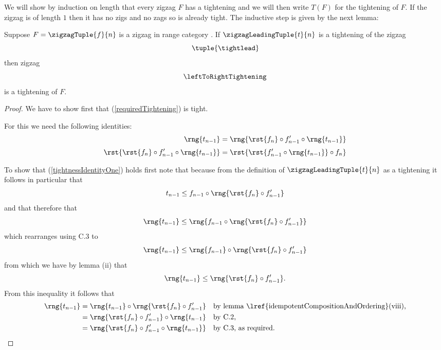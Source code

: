 We will show by induction on length that every zigzag $F$ has a tightening and we will then write $T(F)$ for the tightening of $F$.
If the zigzag is of length $1$ then it has no zigs and no zags so is already tight. The inductive step is given by the next lemma: 

{  %

\begin{lemma}
Suppose  $F=\zigzagTuple{f}{n}$ is a zigzag in range category \catcw.
If  $\zigzagLeadingTuple{t}{n}$ is a tightening of the zigzag
\begin{equation}
\label{inductionPrecursor}
\tuple{\tightlead}
\end{equation}
then  zigzag
\begin{equation}
\label{requiredTightening}\leftToRightTightening
\end{equation}
is a tightening of $F$. 
\end{lemma}
\begin{proof}
We have to show first that (\ref{requiredTightening}) is tight. 

For this we need the following identities:
\begin{align}
\label{tightnessIdentityOne}
\rng{t_{n-1}} &= \rng{\rst{f_n} \circ f'_{n-1} \circ \rng{t_{n-1}}}  \\[0.1cm]
\label{tightnessIdentityTwo}
\rst{\rst{f_n} \circ f'_{n-1} \circ \rng{t_{n-1}}}&=\rst{\rst{f'_{n-1} \circ \rng{t_{n-1}}} \circ f_n}
\end{align}

To show that (\ref{tightnessIdentityOne}) holds first note that 
because from the definition of $\zigzagLeadingTuple{t}{n}$ as a tightening
it follows in particular that
\[
t_{n-1} \leq f_{n-1} \circ \rng{\rst{f_n} \circ f'_{n-1}}
\]
and that therefore that
\[
\rng{t_{n-1}} \leq \rng{f_{n-1} \circ \rng{\rst{f_n} \circ f'_{n-1}}}
\]
which rearranges using C.3 to
\[
\rng{t_{n-1}} \leq \rng{f_{n-1}} \circ \rng{\rst{f_n} \circ f'_{n-1}}
\]
from which we have by lemma (ii)
that 
\[
\rng{t_{n-1}} \leq \rng{\rst{f_n} \circ f'_{n-1}}.
\]
From this inequality it follows that
\begin{align*}
\rng{t_{n-1}} 
           &= \rng{t_{n-1}} \circ \rng{\rst{f_n} \circ f'_{n-1}}
           && \mbox{by lemma \lref{idempotentCompositionAndOrdering}(viii),}\\
           &= \rng{\rst{f_n} \circ f'_{n-1}} \circ \rng{t_{n-1}}
           && \mbox{by C.2,}\\
           &= \rng{\rst{f_n} \circ f'_{n-1} \circ \rng{t_{n-1}}}
           &&\mbox{by C.3, as required.}
\end{align*}


\end{proof}}
